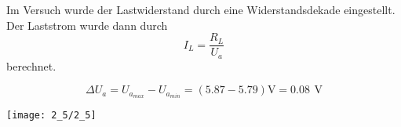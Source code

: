 \documentclass[a4paper, 12pt]{article}
\begin{document}
Im Versuch wurde der Lastwiderstand durch eine Widerstandsdekade eingestellt.
Der Laststrom wurde dann durch
$$ I_L = \frac{R_L}{U_a} $$
\noindent berechnet.

$$ \Delta U_a = U_{a_{max}} - U_{a_{min}} = (5.87 - 5.79) \si{\volt} = 0.08 \,\
\si{\volt}$$

\begin{center}
 \texttt{[image: 2\_5/2\_5]}
\end{center}
\end{document}
